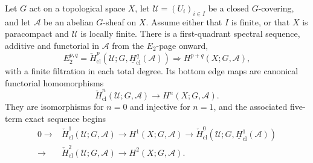 \begin{lemma}
\label{lemma-equivariant-cech-spectral-sequence-closed-covering}
\begin{reference}
\cite[Chapter V, \S 5.5, Theorem 5.5.3 and Corollary 2,
pp. 208--209]{Tohoku}
\end{reference}
Let $G$ act on a topological space $X$, let
$\mathcal U=(U_i)_{i\in I}$ be a closed $G$-covering, and let $\mathcal A$ be
an abelian $G$-sheaf on $X$.  Assume either that $I$ is finite, or that $X$
is paracompact and $\mathcal U$ is locally finite.  There is a first-quadrant
spectral sequence, additive and functorial in $\mathcal A$ from the
$E_2$-page onward,
$$
E_2^{p,q}=\check H^p_{\mathrm{cl}}
 (\mathcal U;G,\underline H^q_{\mathrm{cl}}(\mathcal A))
 \Longrightarrow H^{p+q}(X;G,\mathcal A),
$$
with a finite filtration in each total degree.  Its bottom edge maps are
canonical functorial homomorphisms
$$
\check H^n_{\mathrm{cl}}(\mathcal U;G,\mathcal A)
 \longrightarrow H^n(X;G,\mathcal A).
$$
They are isomorphisms for $n=0$ and injective for $n=1$, and the associated
five-term exact sequence begins
$$
\begin{aligned}
0\longrightarrow{}&\check H^1_{\mathrm{cl}}(\mathcal U;G,\mathcal A)
\longrightarrow H^1(X;G,\mathcal A)
\longrightarrow \check H^0_{\mathrm{cl}}
 (\mathcal U;G,\underline H^1_{\mathrm{cl}}(\mathcal A))\\
\longrightarrow{}&\check H^2_{\mathrm{cl}}(\mathcal U;G,\mathcal A)
\longrightarrow H^2(X;G,\mathcal A).
\end{aligned}
$$
\end{lemma}


